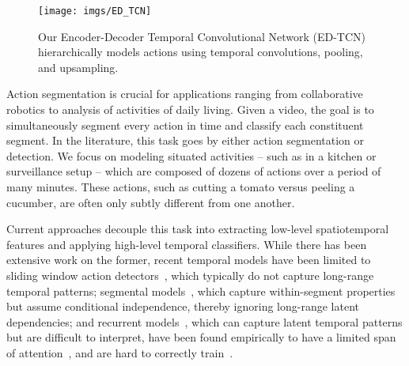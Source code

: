 \documentclass[10pt,twocolumn,letterpaper]{article}
\begin{document}
\begin{figure}
	\centering
	\texttt{[image: imgs/ED\_TCN]}
	\caption{Our Encoder-Decoder Temporal Convolutional Network (ED-TCN) hierarchically models actions using temporal convolutions, pooling, and upsampling.}
	\label{fig:ED_TCN}
\end{figure}


Action segmentation is crucial for applications ranging from collaborative robotics to analysis of activities of daily living. Given a video, the goal is to simultaneously segment every action in time and classify each constituent segment. 
In the literature, this task goes by either action segmentation or detection. 
We focus on modeling situated activities -- such as in a kitchen or surveillance setup -- which are composed of dozens of actions over a period of many minutes. 
These actions, such as cutting a tomato versus peeling a cucumber, are often only subtly different from one another.



Current approaches decouple this task into extracting low-level spatiotemporal features and applying high-level temporal classifiers. 
While there has been extensive work on the former, recent temporal models have been limited to sliding window action detectors~\cite{rohrbach_ijcv_2015,singh_cvpr_2016_merl,ni_cvpr_2016}, which typically do not capture long-range temporal patterns; segmental models~\cite{richard_cvpr_2016,lea_eccv_2016,pirsiavash_cvpr_2014}, which capture within-segment properties but assume conditional independence, thereby ignoring long-range latent dependencies;
and recurrent models~\cite{singh_cvpr_2016_merl,huang_eccv_2016}, which can capture latent temporal patterns 
but are difficult to interpret, have been found empirically to have a limited span of attention~\cite{singh_cvpr_2016_merl}, and are hard to correctly train~\cite{pascanu_icml_2013}. 
\end{document}
